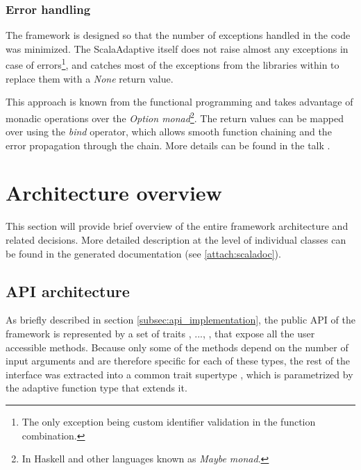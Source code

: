 \subsubsection{Error handling}

The framework is designed so that the number of exceptions handled in the code was minimized. The ScalaAdaptive itself does not raise almost any exceptions in case of errors\footnote{The only exception being custom identifier validation in the function combination.}, and catches most of the exceptions from the libraries within to replace them with a \textit{None} return value.

This approach is known from the functional programming and takes advantage of monadic operations over the \textit{Option monad}\footnote{In Haskell and other languages known as \textit{Maybe monad}.}. The return values can be mapped over using the \textit{bind} operator, which allows smooth function chaining and the error propagation through the chain. More details can be found in the talk \cite{noauthor_railway_nodate}.

\section{Architecture overview}
\label{sec:architecture_overview}

This section will provide brief overview of the entire framework architecture and related decisions. More detailed description at the level of individual classes can be found in the generated documentation (see \ref{attach:scaladoc}).

\subsection{API architecture}
\label{subsec:api_architecture}

As briefly described in section \ref{subsec:api_implementation}, the public API of the framework is represented by a set of traits , ..., , that expose all the user accessible methods. Because only some of the methods depend on the number of input arguments and are therefore specific for each of these types, the rest of the interface was extracted into a common trait supertype , which is parametrized by the adaptive function type that extends it. 

